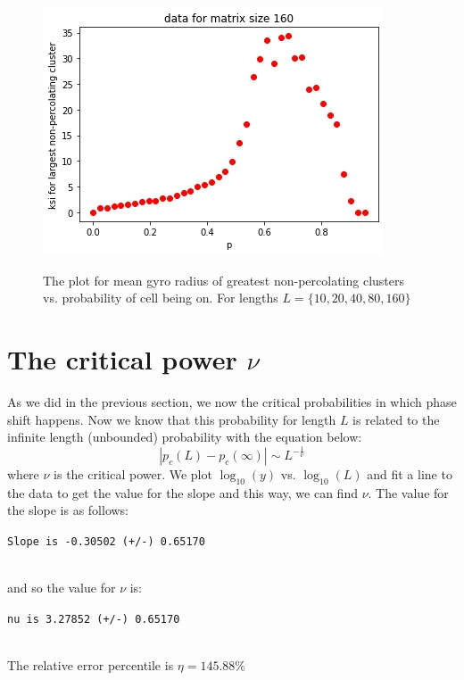 \documentclass[12pt]{article}
\begin{document}
	\begin{figure}[h!]
	\centering
	\includegraphics[width=0.9\linewidth]{../p5/fig4.jpg}
	\label{fig:gyroCluster4}
	\caption{The plot for mean gyro radius  of greatest non-percolating clusters vs. probability of cell being on. For lengths $L = \{10, 20, 40, 80, 160\}$}
\end{figure}

	\section{The critical power $\nu$}
	As we did in the previous section, we now the critical probabilities in which phase shift happens. Now we know that this probability for length $L$ is related to the infinite length (unbounded) probability with the equation below:\\
	\begin{equation}
		|p_c(L) - p_c(\infty)| \sim L^{-\frac{1}{\nu}}
	\end{equation}
	where $\nu$ is the critical power. We plot $\log_{10}(y)$ vs. $\log_{10}(L)$ and fit a line to the data to get
	the value for the slope and this way, we can find $\nu$.
	The value for the slope is as follows:\\
	\centerline{\texttt{Slope is -0.30502 (+/-) 0.65170}}\\
	and so the value for $\nu$ is:\\
	\centerline{\texttt{nu is 3.27852 (+/-) 0.65170}}\\
	The relative error percentile is $\eta = 145.88 \%$
\end{document}
